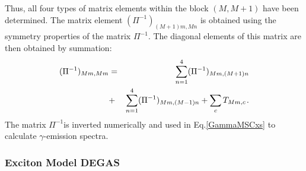 Thus, all four types of matrix elements within the block $(M,M+1)$ have been
determined. The matrix element $(\Pi^{-1})_{(M+1)m,Mn}$ is obtained using
the symmetry properties of the matrix $\Pi^{-1}$. The diagonal elements of
this matrix are then obtained by summation: 
\begin{eqnarray}
(\Pi^{-1})_{Mm,Mm} &=& \sum_{n=1}^{4}(\Pi^{-1})_{Mm,(M+1)n} \\
&+& \sum_{n=1}^{4}(\Pi^{-1})_{Mm,(M-1)n} + \sum_{c}T_{Mm,c} \hspace{1pt}. 
\notag
\end{eqnarray}
The matrix $\Pi^{-1}$is inverted numerically and used in Eq.\ref{GammaMSCxs}
to calculate $\gamma$-emission spectra.


\subsubsection{Exciton Model DEGAS\label{DEGAS}}

